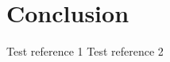 \documentclass[journal]{IEEEtran}
\begin{document}

\section{Conclusion}


\pagebreak
\begin{thebibliography}{00}
     Test reference 1
     Test reference 2
\end{thebibliography}
\end{document}
